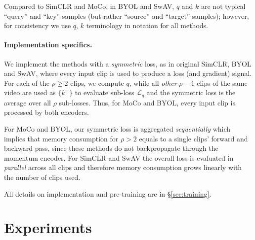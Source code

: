 \documentclass[final]{cvpr}
\begin{document}
		 Compared to SimCLR and MoCo, in BYOL and SwAV,  $q$ and  $k$  are not typical ``query'' and ``key'' samples (but rather ``source'' and ``target'' samples); however, for consistency we use $q$, $k$ terminology in notation for all methods.
	 
	 \paragraph{Implementation specifics.} 
	 
	We implement the methods with a \textit{symmetric} loss, as in original SimCLR, BYOL and SwAV, where every input clip is used to produce a loss (and gradient) signal. For each of the $\rho\geq2$ clips, we compute $q$, while all \textit{other} $\rho{-}1$ clips of the same video are used as $\{k^{+}\}$ to evaluate sub-loss $\mathcal{L}_{q}$	
	and the symmetric loss is the average over all $\rho$  sub-losses.
 Thus, for MoCo and BYOL, every input clip is processed by both encoders.
	
		
	For MoCo and BYOL, our symmetric loss is aggregated \textit{sequentially} which implies that memory consumption for $\rho>2$ equals to a single clips' forward and backward pass, since these methods do not backpropagate through the momentum encoder. For  SimCLR and SwAV the overall loss is evaluated in \textit{parallel} across all clips and therefore memory consumption grows linearly with the number of clips used. %
	
	All details on implementation and pre-training are in \S\ref{sec:training}. 
	
	\section{Experiments} \label{sec:experiments}
	
\end{document}
